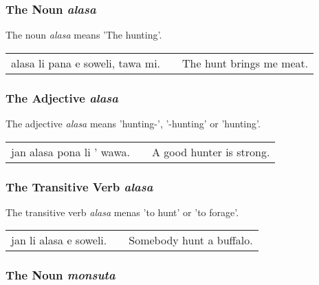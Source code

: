 %
%
\subsubsection*{The Noun \textit{alasa}}
%

The noun \textit{alasa} means 'The hunting'.

\begin{supertabular}{p{5,5cm}|ll}
alasa li pana e soweli, tawa mi. && The hunt brings me meat.\\
\end{supertabular}

%
\subsubsection*{The Adjective \textit{alasa}}
%

The adjective \textit{alasa} means 'hunting-', '-hunting' or 'hunting'.

\begin{supertabular}{p{5,5cm}|ll}
jan alasa pona li ' wawa. && A good hunter is strong. \\
\end{supertabular}

%
\subsubsection*{The Transitive Verb \textit{alasa}}
%

The transitive verb \textit{alasa} menas 'to hunt' or 'to forage'.

\begin{supertabular}{p{5,5cm}|ll}
jan li alasa e soweli. && Somebody hunt a buffalo. \\
\end{supertabular}

%
%
\subsubsection*{The Noun \textit{monsuta}}
%


